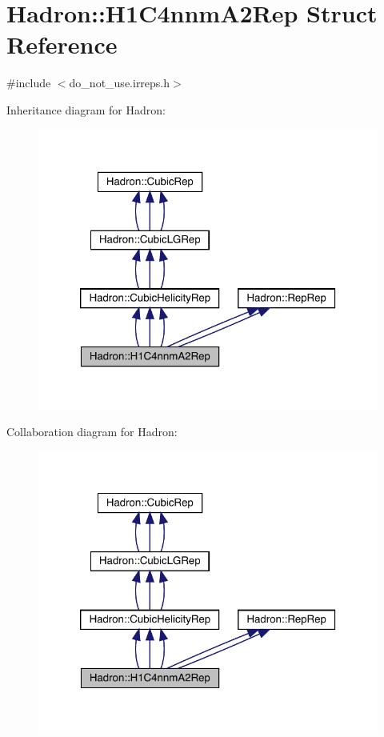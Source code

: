\hypertarget{structHadron_1_1H1C4nnmA2Rep}{}\section{Hadron\+:\+:H1\+C4nnm\+A2\+Rep Struct Reference}
\label{structHadron_1_1H1C4nnmA2Rep}


{\ttfamily \#include $<$do\+\_\+not\+\_\+use.\+irreps.\+h$>$}



Inheritance diagram for Hadron\+:
\nopagebreak
\begin{figure}[H]
\begin{center}
\leavevmode
\includegraphics[width=320pt]{dd/da7/structHadron_1_1H1C4nnmA2Rep__inherit__graph}
\end{center}
\end{figure}


Collaboration diagram for Hadron\+:
\nopagebreak
\begin{figure}[H]
\begin{center}
\leavevmode
\includegraphics[width=320pt]{d4/d2d/structHadron_1_1H1C4nnmA2Rep__coll__graph}
\end{center}
\end{figure}
